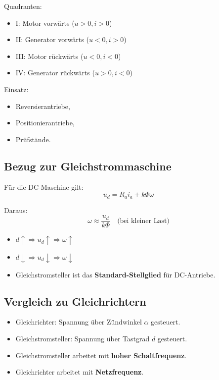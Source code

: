 Quadranten:
\begin{itemize}
\item I: Motor vorwärts ($u>0,i>0$)
\item II: Generator vorwärts ($u<0,i>0$)
\item III: Motor rückwärts ($u<0,i<0$)
\item IV: Generator rückwärts ($u>0,i<0$)
\end{itemize}

Einsatz:
\begin{itemize}
\item Reversierantriebe,
\item Positionierantriebe,
\item Prüfstände.
\end{itemize}

\subsection{Bezug zur Gleichstrommaschine}

Für die DC-Maschine gilt:
\[
\boxed{u_d = R_a i_a + k\Phi \omega}
\]

Daraus:
\[
\boxed{\omega \approx \frac{u_d}{k\Phi} \quad \text{(bei kleiner Last)}}
\]

\begin{itemize}
\item $d\uparrow \Rightarrow u_d\uparrow \Rightarrow \omega\uparrow$
\item $d\downarrow \Rightarrow u_d\downarrow \Rightarrow \omega\downarrow$
\item Gleichstromsteller ist das \textbf{Standard-Stellglied} für DC-Antriebe.
\end{itemize}

\subsection{Vergleich zu Gleichrichtern}

\begin{itemize}
\item Gleichrichter: Spannung über Zündwinkel $\alpha$ gesteuert.
\item Gleichstromsteller: Spannung über Tastgrad $d$ gesteuert.
\item Gleichstromsteller arbeitet mit \textbf{hoher Schaltfrequenz}.
\item Gleichrichter arbeitet mit \textbf{Netzfrequenz}.
\end{itemize}

